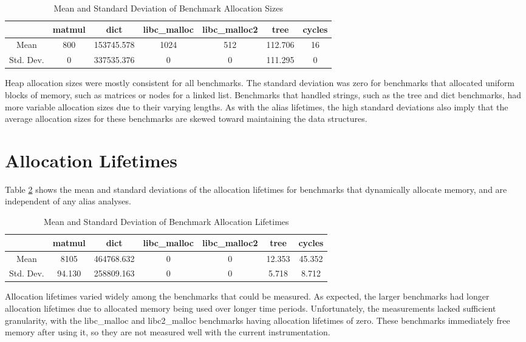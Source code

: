 \begin{table} [h!]
\centering
   \begin{tabular} {|c|c c c c c c|}
      \hline
      & matmul & dict & libc\_malloc & libc\_malloc2 & tree & cycles \\
      \hline
      Mean & 800 & 153745.578 & 1024 & 512 & 112.706 & 16 \\
      \hline
      Std. Dev. & 0 & 337535.376 & 0 & 0 & 111.295 & 0 \\
      \hline
   \end{tabular}
   \caption{Mean and Standard Deviation of Benchmark Allocation Sizes}
   \label{table:5}
\end{table}

Heap allocation sizes were mostly consistent for all benchmarks. The standard deviation was zero for benchmarks that allocated uniform blocks of memory, such as matrices or nodes for a linked list. Benchmarks that handled strings, such as the tree and dict benchmarks, had more variable allocation sizes due to their varying lengths. As with the alias lifetimes, the high standard deviations also imply that the average allocation sizes for these benchmarks are skewed toward maintaining the data structures.

\section{Allocation Lifetimes}
Table \ref{table:6} shows the mean and standard deviations of the allocation lifetimes for benchmarks that dynamically allocate memory, and are independent of any alias analyses.

\begin{table} [h!]
\centering
   \begin{tabular} {|c|c c c c c c|}
      \hline
      & matmul & dict & libc\_malloc & libc\_malloc2 & tree & cycles \\
      \hline
      Mean & 8105 & 464768.632 & 0 & 0 & 12.353 & 45.352 \\
      \hline
      Std. Dev. & 94.130 & 258809.163 & 0 & 0 & 5.718 & 8.712 \\
      \hline
   \end{tabular}
   \caption{Mean and Standard Deviation of Benchmark Allocation Lifetimes}
   \label{table:6}
\end{table}

Allocation lifetimes varied widely among the benchmarks that could be measured. As expected, the larger benchmarks had longer allocation lifetimes due to allocated memory being used over longer time periods. Unfortunately, the measurements lacked sufficient granularity, with the libc\_malloc and libc2\_malloc benchmarks having allocation lifetimes of zero. These benchmarks immediately free memory after using it, so they are not measured well with the current instrumentation.
